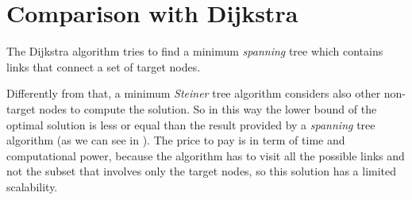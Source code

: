 \section{Comparison with Dijkstra}\label{sec:comparison}

The Dijkstra algorithm tries to find a minimum \emph{spanning} tree which
contains links that connect a set of target nodes.

Differently from that, a minimum \emph{Steiner} tree algorithm considers also
other non-target nodes to compute the solution. So in this way the lower bound
of the optimal solution is less or equal than the result provided by a
\emph{spanning} tree algorithm (as we can see in ). The
price to pay is in term of time and computational power, because the algorithm
has to visit all the possible links and not the subset that involves only the
target nodes, so this solution has a limited scalability.

